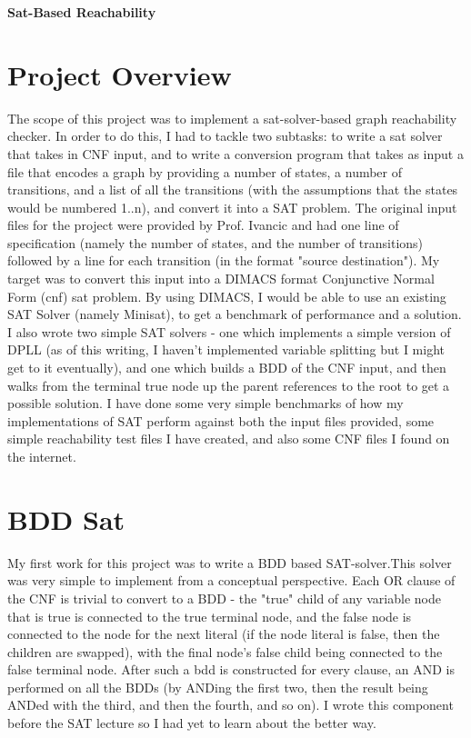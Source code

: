 \documentclass[11pt]{article}
\begin{document}
\begin{center}
\huge{\bf{Sat-Based Reachability}}
\end{center}
\begin{flushleft}
\section{Project Overview} The scope of this project was to implement a sat-solver-based graph reachability checker. In order to do this, I had to tackle two subtasks: to write a sat solver that takes in CNF input, and to write a conversion program that takes as input a file that encodes a graph by providing a number of states, a number of transitions, and a list of all the transitions (with the assumptions that the states would be numbered 1..n), and convert it into a SAT problem. The original input files for the project were provided by Prof. Ivancic and had one line of specification (namely the number of states, and the number of transitions) followed by a line for each transition (in the format "source destination"). My target was to convert this input into a DIMACS format Conjunctive Normal Form (cnf) sat problem. By using DIMACS, I would be able to use an existing SAT Solver (namely Minisat), to get a benchmark of performance and a solution. I also wrote two simple SAT solvers - one which  implements a simple version of DPLL (as of this writing, I haven't implemented variable splitting but I might get to it eventually), and one which builds a BDD of the CNF input, and then walks from the terminal true node up the parent references to the root to get a possible solution. I have done some very simple benchmarks of how my implementations of SAT perform against both the input files provided, some simple reachability test files I have created, and also some CNF files I found on the internet.
\section{BDD Sat}
My first work for this project was to write a BDD based SAT-solver.This solver was very simple to implement from a conceptual perspective. Each OR clause of the CNF is trivial to convert to a BDD - the "true" child of any variable node that is true is connected to the true terminal node, and the false node is connected to the node for the next literal (if the node literal is false, then the children are swapped), with the final node's false child being connected to the false terminal node. After such a bdd is constructed for every clause, an AND is performed on all the BDDs (by ANDing the first two, then the result being ANDed with the third, and then the fourth, and so on). I wrote this component before the SAT lecture so I had yet to learn about the better way.


\end{flushleft}
\end{document}
